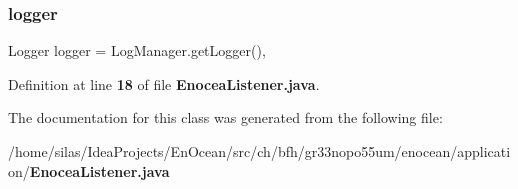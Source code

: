 \subsubsection{logger}
{\footnotesize\ttfamily Logger logger = Log\+Manager.\+get\+Logger()\hspace{0.3cm}{\ttfamily [static]}, {\ttfamily [private]}}



Definition at line {\bf 18} of file {\bf Enocea\+Listener.\+java}.



The documentation for this class was generated from the following file\+:\begin{DoxyCompactItemize}
\item 
/home/silas/\+Idea\+Projects/\+En\+Ocean/src/ch/bfh/gr33nopo55um/enocean/application/{\bf Enocea\+Listener.\+java}\end{DoxyCompactItemize}
